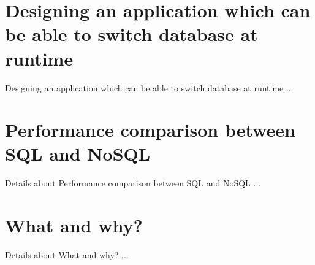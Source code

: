 \section {Designing an application which can be able to switch database at runtime}
\tab Designing an application which can be able to switch database at runtime ...
\newline

\section {Performance comparison between SQL and NoSQL}
\tab Details about Performance comparison between SQL and NoSQL ...
\newline


\section {What and why?}
\tab Details about What and why? ...
\newline